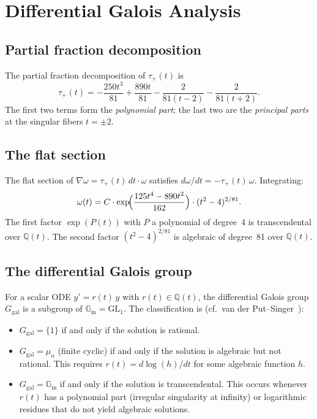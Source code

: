 \documentclass[11pt]{article}
\theoremstyle{plain}
\theoremstyle{definition}
\theoremstyle{remark}
\newcommand{\Q}{\mathbb{Q}}
\newcommand{\GL}{\mathrm{GL}}
\newcommand{\Ggal}{G_{\mathrm{gal}}}
\newcommand{\Gm}{\mathbb{G}_{\mathrm{m}}}
\begin{document}
\section{Differential Galois Analysis}

\subsection{Partial fraction decomposition}

The partial fraction decomposition of $\tau_+(t)$ is
\begin{equation}\label{eq:pf}
\tau_+(t) = -\frac{250t^3}{81} + \frac{890t}{81}
- \frac{2}{81(t-2)} - \frac{2}{81(t+2)}.
\end{equation}
The first two terms form the \emph{polynomial part}; the last two
are the \emph{principal parts} at the singular fibers $t = \pm 2$.

\subsection{The flat section}

The flat section of $\nabla\omega = \tau_+(t)\, dt \cdot \omega$ satisfies
$d\omega/dt = -\tau_+(t)\, \omega$. Integrating:
\begin{equation}\label{eq:flat}
\omega(t) = C \cdot \exp\!\Bigl(\frac{125t^4 - 890t^2}{162}\Bigr)
\cdot (t^2 - 4)^{2/81}.
\end{equation}
The first factor $\exp(P(t))$ with $P$ a polynomial of degree~4 is
transcendental over $\Q(t)$. The second factor $(t^2 - 4)^{2/81}$ is
algebraic of degree~81 over $\Q(t)$.

\subsection{The differential Galois group}

For a scalar ODE $y' = r(t)\, y$ with $r(t) \in \Q(t)$, the differential
Galois group $\Ggal$ is a subgroup of $\Gm = \GL_1$. The classification
is (cf.\ van der Put--Singer~\cite{PS2003}):
\begin{itemize}[nosep]
\item $\Ggal = \{1\}$ if and only if the solution is rational.
\item $\Ggal = \mu_n$ (finite cyclic) if and only if the solution is
  algebraic but not rational. This requires $r(t) = d\log(h)/dt$ for
  some algebraic function $h$.
\item $\Ggal = \Gm$ if and only if the solution is transcendental.
  This occurs whenever $r(t)$ has a polynomial part (irregular singularity
  at infinity) or logarithmic residues that do not yield algebraic solutions.
\end{itemize}
\end{document}
